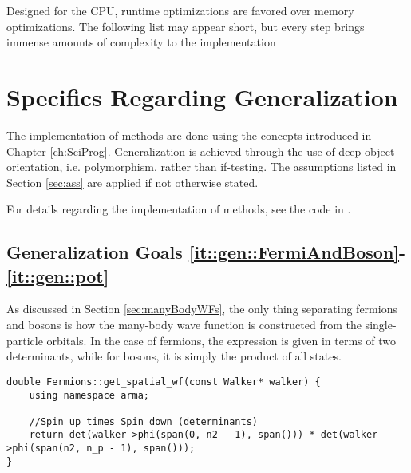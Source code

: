 Designed for the CPU, runtime optimizations are favored over memory optimizations. The following list may appear short, but every step brings immense amounts of complexity to the implementation


\clearpage
\section{Specifics Regarding Generalization}

The implementation of methods are done using the concepts introduced in Chapter \ref{ch:SciProg}. Generalization is achieved through the use of deep object orientation, i.e. polymorphism, rather than if-testing. The assumptions listed in Section \ref{sec:ass} are applied if not otherwise stated.

For details regarding the implementation of methods, see the code in \cite{libBorealisCode}.

\subsection{Generalization Goals \ref{it::gen::FermiAndBoson}-\ref{it::gen::pot}}

As discussed in Section \ref{sec:manyBodyWFs}, the only thing separating fermions and bosons is how the many-body wave function is constructed from the single-particle orbitals. In the case of fermions, the expression is given in terms of two determinants, while for bosons, it is simply the product of all states.

\vspace{0.2cm}
\begin{lstlisting}
double Fermions::get_spatial_wf(const Walker* walker) {
    using namespace arma;
    
    //Spin up times Spin down (determinants)
    return det(walker->phi(span(0, n2 - 1), span())) * det(walker->phi(span(n2, n_p - 1), span()));
}
\end{lstlisting}


